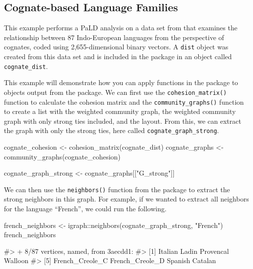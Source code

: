 \hypertarget{cognate-based-language-families}{%
\subsection{Cognate-based Language
Families}\label{cognate-based-language-families}}

This example performs a PaLD analysis on a data set from \citet{dyen92}
that examines the relationship between 87 Indo-European languages from
the perspective of cognates, coded using 2,655-dimensional binary
vectors. A \texttt{dist} object was created from this data set and is
included in the  package in an object called
\texttt{cognate\_dist}.

This example will demonstrate how you can apply functions in the
 package to objects output from the 
package. We can first use the \texttt{cohesion\_matrix()} function to
calculate the cohesion matrix and the \texttt{community\_graphs()}
function to create a list with the weighted community graph, the
weighted community graph with only strong ties included, and the layout.
From this, we can extract the graph with only the strong ties, here
called \texttt{cognate\_graph\_strong}.

\begin{Schunk}
\begin{Sinput}
cognate_cohesion <- cohesion_matrix(cognate_dist)
cognate_graphs <- community_graphs(cognate_cohesion)

cognate_graph_strong <- cognate_graphs[["G_strong"]]
\end{Sinput}
\end{Schunk}

We can then use the \texttt{neighbors()} function from the
 package to extract the strong neighbors in this graph.
For example, if we wanted to extract all neighbors for the language
``French'', we could run the following.

\begin{Schunk}
\begin{Sinput}
french_neighbors <- igraph::neighbors(cognate_graph_strong, "French")
french_neighbors
\end{Sinput}
\begin{Soutput}
#> + 8/87 vertices, named, from 3aecdd1:
#> [1] Italian         Ladin           Provencal       Walloon        
#> [5] French_Creole_C French_Creole_D Spanish         Catalan
\end{Soutput}
\end{Schunk}

